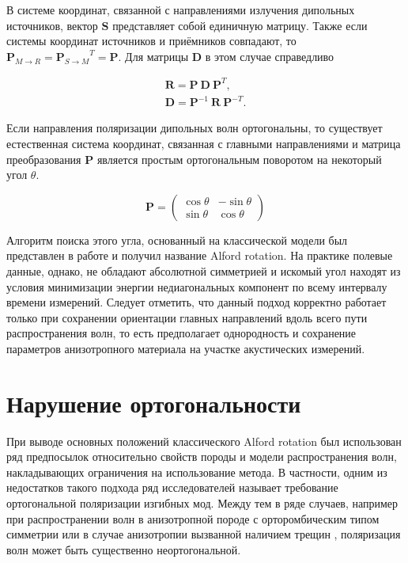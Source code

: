 \documentclass[a4paper,11pt]{article}
\begin{document}
В системе координат, связанной с направлениями излучения дипольных источников, вектор $\mathbf{S}$ представляет собой единичную матрицу. Также если системы координат источников и приёмников совпадают, то $\mathbf{P}_{M \rightarrow R}={\mathbf{P}_{S \rightarrow M}}^{T} = \mathbf{P}$. Для матрицы $\mathbf{D}$ в этом случае справедливо

\begin{gather}
	\mathbf{R} = \mathbf{P} \ \mathbf{D} \ \mathbf{P}^T, \label{eq:alford_symmetric} \\ 
	\mathbf{D} = \mathbf{P}^{-1} \ \mathbf{R} \ \mathbf{P}^{-T}.
\end{gather}

Если направления поляризации дипольных волн ортогональны, то существует естественная система координат, связанная с главными направлениями и матрица преобразования $\mathbf{P}$ является простым ортогональным поворотом на некоторый угол $\theta$. 

\begin{equation*}
	\mathbf{P} = \left(
	\begin{array}{cc}
	\cos \theta &-\sin \theta \\ 
	\sin \theta & \cos \theta
	\end{array} 
	\right) 
\end{equation*}

Алгоритм поиска этого угла, основанный на классической модели был представлен в работе \cite{Alford1986} и получил название Alford rotation. На практике полевые данные, однако, не обладают абсолютной симметрией и искомый угол находят из условия минимизации энергии недиагональных компонент по всему интервалу времени измерений. Следует отметить, что данный подход корректно работает только при сохранении ориентации главных направлений вдоль всего пути распространения волн, то есть предполагает однородность и сохранение параметров анизотропного материала на участке акустических измерений.

\section{Нарушение ортогональности}

При выводе основных положений классического Alford rotation был использован ряд предпосылок относительно свойств породы и модели распространения волн, накладывающих ограничения на использование метода. В частности, одним из недостатков такого подхода ряд исследователей называет требование ортогональной поляризации изгибных мод. Между тем в ряде случаев, например при распространении волн в анизотропной породе с орторомбическим типом симметрии \cite{Dellinger2001} или в случае анизотропии вызванной наличием трещин \cite{Nolte1996}, поляризация волн может быть существенно неортогональной. 
\end{document}
